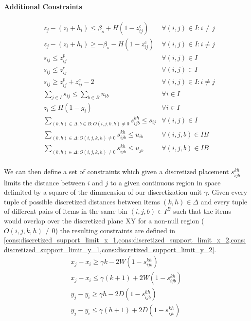 \paragraph*{Additional Constraints}
\label{par:support_const}
\begin{align}
    & z_j - (z_i + h_i) \le \beta_s + H (1 - z^c_{ij}) & \forall (i, j) \in I : i \neq j \label{cons:z_close_1} \\
    & z_j - (z_i + h_i) \ge -\beta_s - H (1 - z^c_{ij}) & \forall (i, j) \in I : i \neq j \label{cons:z_close_2} \\
    & s_{ij} \le z^p_{ij} & \forall (i, j) \in I  \label{cons:supporting_1} \\
    & s_{ij} \le z^c_{ij} & \forall (i, j) \in I  \label{cons:supporting_2} \\
    & s_{ij} \ge z^p_{ij} + z^c_{ij} - 2 & \forall (i, j) \in I : i \neq j \label{cons:supporting} \\
    & \sum\limits_{j \in I}{s_{ij}} \le \sum\limits_{b \in B}{u_{ib}} & \forall i \in I  \label{cons:support_comes_from_placed} \\
    & z_i \le H(1 - g_i) & \forall i \in I \label{cons:grounded} \\
    & \sum\limits_{(k, h) \in \Delta, b \in B : O(i, j, k, h) \neq 0} s^{k h}_{i j b} \le s_{ij} & \forall (i, j) \in I \label{cons:discretized_support_same} \\
    & \sum\limits_{(k, h) \in \Delta : O(i, j, k, h) \neq 0} s^{k h}_{i j b} \le u_{ib} & \forall (i, j, b) \in IB \label{cons:discretized_support_right_bin_i} \\
    & \sum\limits_{(k, h) \in \Delta : O(i, j, k, h) \neq 0} s^{k h}_{i j b} \le u_{jb} & \forall (i, j, b) \in IB \label{cons:discretized_support_right_bin_j} \\
\end{align}

We can then define a set of constraints which given a discretized placement $s^{k h}_{i j b}$ limits the distance between $i$ and $j$ to a given continuous region in space delimited by a square of the dimmension of our discretization unit $\gamma$. 
Given every tuple of possible discretized distances between items $ (k, h) \in \Delta$ and every tuple of different pairs of items in the same bin $(i, j, b) \in I^B$ such that the items would overlap over the discretized plane XY for a non-null region ($O(i, j, k, h) \neq 0$) the resulting constraints are defined in \cref{cons:discretized_support_limit_x_1,cons:discretized_support_limit_x_2,cons:discretized_support_limit_y_1,cons:discretized_support_limit_y_2}.
\begin{align}
    & x_j - x_i \ge \gamma k - 2W( 1 - s^{k h}_{i j b}) &  \label{cons:discretized_support_limit_x_1} \\
    & x_j - x_i \le \gamma (k + 1) + 2W( 1 - s^{k h}_{i j b}) &  \label{cons:discretized_support_limit_x_2} \\
    & y_j - y_i \ge \gamma h - 2D( 1 - s^{k h}_{i j b}) &  \label{cons:discretized_support_limit_y_1} \\
    & y_j - y_i \le \gamma (h + 1) + 2D( 1 - s^{k h}_{i j b}) &  \label{cons:discretized_support_limit_y_2}
\end{align}

